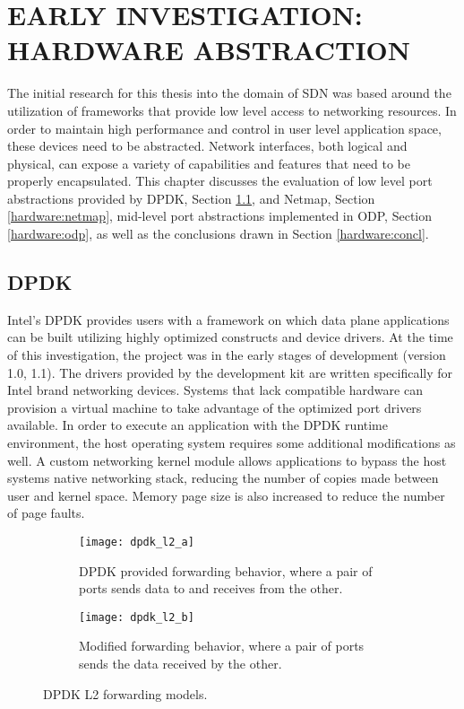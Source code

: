 \chapter{EARLY INVESTIGATION: HARDWARE ABSTRACTION}
\label{hardware}
The initial research for this thesis into the domain of SDN was based around
the utilization of frameworks that provide low level access to networking
resources. In order to maintain high performance and control in user level
application space, these devices need to be abstracted. Network interfaces,
both logical and physical, can expose a variety of capabilities and features
that need to be properly encapsulated. This chapter discusses the evaluation of
low level port abstractions provided by DPDK, Section \ref{hardware:dpdk}, and
Netmap, Section \ref{hardware:netmap}, mid-level port abstractions implemented
in ODP, Section \ref{hardware:odp}, as well as the conclusions drawn in Section
\ref{hardware:concl}.

\section{DPDK}
\label{hardware:dpdk}
Intel's DPDK provides users with a framework on which data plane applications
can be built utilizing highly optimized constructs and device drivers. At the
time of this investigation, the project was in the early stages of development
(version 1.0, 1.1). The drivers provided by the development kit are written
specifically for Intel brand networking devices. Systems that lack compatible
hardware can provision a virtual machine to take advantage of the optimized
port drivers available. In order to execute an application with the DPDK runtime
environment, the host operating system requires some additional modifications
as well. A custom networking kernel module allows applications to bypass the
host systems native networking stack, reducing the number of copies made
between user and kernel space. Memory page size is also increased to reduce
the number of page faults.

\begin{figure}[h!]
  \centering
  \begin{subfigure}[b]{0.48\textwidth}
    \centering
    \texttt{[image: dpdk\_l2\_a]}
    \caption{DPDK provided forwarding behavior, where a pair of ports sends
    data to and receives from the other.}
  \end{subfigure}
  \hfill
  \begin{subfigure}[b]{0.48\textwidth}
    \centering
    \texttt{[image: dpdk\_l2\_b]}
    \caption{Modified forwarding behavior, where a pair of ports sends the data
    received by the other.}
  \end{subfigure}
  \caption{DPDK L2 forwarding models.}
  \label{dpdk_l2}
\end{figure}

